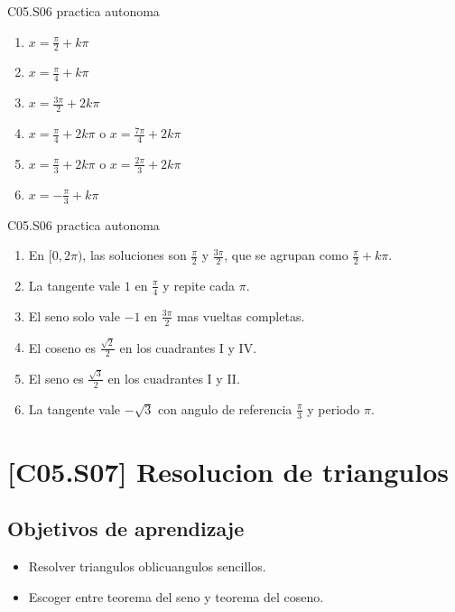 \begin{shortanswer}{C05.S06 practica autonoma}
\begin{enumerate}[label=\textbf{PX-C05.S06-\arabic*:}, leftmargin=*]
  \item \(x=\frac{\pi}{2}+k\pi\)
  \item \(x=\frac{\pi}{4}+k\pi\)
  \item \(x=\frac{3\pi}{2}+2k\pi\)
  \item \(x=\frac{\pi}{4}+2k\pi\) o \(x=\frac{7\pi}{4}+2k\pi\)
  \item \(x=\frac{\pi}{3}+2k\pi\) o \(x=\frac{2\pi}{3}+2k\pi\)
  \item \(x=-\frac{\pi}{3}+k\pi\)
\end{enumerate}
\end{shortanswer}

\begin{fullsolution}{C05.S06 practica autonoma}
\begin{enumerate}[label=\textbf{PX-C05.S06-\arabic*:}, leftmargin=*]
  \item En \([0,2\pi)\), las soluciones son \(\frac{\pi}{2}\) y \(\frac{3\pi}{2}\), que se
  agrupan como \(\frac{\pi}{2}+k\pi\).
  \item La tangente vale \(1\) en \(\frac{\pi}{4}\) y repite cada \(\pi\).
  \item El seno solo vale \(-1\) en \(\frac{3\pi}{2}\) mas vueltas completas.
  \item El coseno es \(\frac{\sqrt{2}}{2}\) en los cuadrantes I y IV.
  \item El seno es \(\frac{\sqrt{3}}{2}\) en los cuadrantes I y II.
  \item La tangente vale \(-\sqrt{3}\) con angulo de referencia \(\frac{\pi}{3}\) y periodo \(\pi\).
\end{enumerate}
\end{fullsolution}

\section{[C05.S07] Resolucion de triangulos}

\subsection*{Objetivos de aprendizaje}
\begin{itemize}
  \item Resolver triangulos oblicuangulos sencillos.
  \item Escoger entre teorema del seno y teorema del coseno.
\end{itemize}

